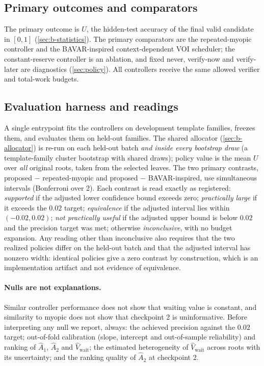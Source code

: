\subsection{Primary outcomes and comparators}

The primary outcome is $U$, the hidden-test accuracy of the final valid
candidate in $[0,1]$ (\cref{sec:b-statistics}).  The primary comparators are the
repeated-myopic controller and the BAVAR-inspired context-dependent VOI
scheduler; the constant-reserve controller is an ablation, and fixed never,
verify-now and verify-later are diagnostics (\cref{sec:policy}).  All controllers receive the same allowed verifier and
total-work budgets.

\subsection{Evaluation harness and readings}
\label{sec:b-readings}

A single entrypoint fits the controllers on development template families,
freezes them, and evaluates them on held-out families.  The shared allocator
(\cref{sec:b-allocator}) is re-run on each held-out batch \emph{and inside every
bootstrap draw} (a template-family cluster bootstrap with shared draws); policy
value is the mean $U$ over \emph{all} original roots, taken from the selected
leaves.  The two primary contrasts, proposed $-$ repeated-myopic and proposed $-$
BAVAR-inspired, use simultaneous intervals (Bonferroni over 2).  Each contrast is
read exactly as registered: \emph{supported} if the adjusted lower confidence
bound exceeds zero; \emph{practically large} if it exceeds the $0.02$ target;
\emph{equivalence} if the adjusted interval lies within $(-0.02,0.02)$;
\emph{not practically useful} if the adjusted upper bound is below $0.02$ and the
precision target was met; otherwise \emph{inconclusive}, with no budget
expansion.  Any reading other than inconclusive also requires that the two
realized policies differ on the held-out batch and that the adjusted interval
has nonzero width: identical policies give a zero contrast by construction,
which is an implementation artifact and not evidence of equivalence.

\paragraph{Nulls are not explanations.}
Similar controller performance does not show that waiting value is constant, and
similarity to myopic does not show that checkpoint 2 is uninformative.  Before
interpreting any null we report, always: the achieved precision against the
$0.02$ target; out-of-fold calibration (slope, intercept and out-of-sample
reliability) and ranking of $\hat A_1$, $\hat A_2$ and $\hat V_{\text{wait}}$; the estimated heterogeneity of $\hat V_{\text{wait}}$
across roots with its uncertainty; and the ranking quality of $\hat A_2$ at
checkpoint 2.

